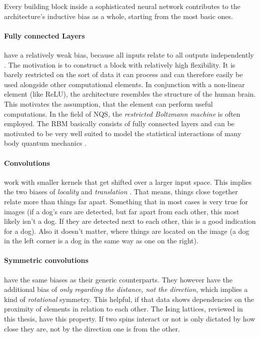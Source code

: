 Every building block inside a sophisticated neural network contributes to the architecture's inductive bias as a whole, starting from the most basic ones.

\paragraph{Fully connected Layers} have a relatively weak bias, because all inputs relate to all outputs independently \cite{relationalInductiveBiasesAndGraphNetworks}. 
The motivation is to construct a block with relatively high flexibility.
It is barely restricted on the sort of data it can process and can therefore easily be used alongside other computational elements.
In conjunction with a non-linear element (like ReLU), the architecture resembles the structure of the human brain. 
This motivates the assumption, that the element can perform useful computations.
In the field of NQS, the \emph{restricted Boltzmann machine} is often employed.
The RBM basically consists of fully connected layers and can be motivated to be very well suited to model the statistical interactions of many body quantum mechanics \cite{restrictedBoltzmanMachines}. 

\paragraph{Convolutions} work with smaller kernels that get shifted over a larger input space.
This implies the two biases of \emph{locality} and \emph{translation} \cite{relationalInductiveBiasesAndGraphNetworks}.
That means, things close together relate more than things far apart. 
Something that in most cases is very true for images (if a dog's ears are detected, but far apart from each other, this most likely isn't a dog. If they are detected next to each other, this is a good indication for a dog).
Also it doesn't matter, where things are located on the image (a dog in the left corner is a dog in the same way as one on the right).

\paragraph{Symmetric convolutions} have the same biases as their generic counterparts. They however have the additional bias of \emph{only regarding the distance, not the direction}, which implies a kind of \emph{rotational} symmetry.
This helpful, if that data shows dependencies on the proximity of elements in relation to each other. 
The Ising lattices, reviewed in this thesis, have this property. 
If two spins interact or not is only dictated by how close they are, not by the direction one is from the other.

